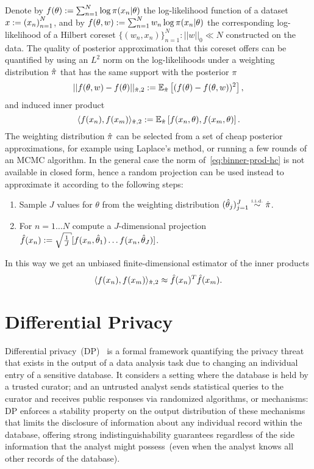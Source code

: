 Denote by $ f(\theta) := \sum_{n=1}^{N} \log\pi(x_n|\theta) $ the log-likelihood function of a dataset $x := {(x_n)}_{n=1}^{N}$, and by $ f(\theta,w) := \sum_{n=1}^{N} w_n\log\pi(x_n|\theta) $ the corresponding log-likelihood of a Hilbert coreset $\{(w_n, x_n)\}_{n=1}^{N} : ||w||_0 \ll N$ constructed on the data. The quality of posterior approximation that this coreset offers can be quantified by using an $L^2$ norm on the log-likelihoods under a weighting distribution $\hat{\pi}$ that has the same support with the posterior $\pi$ 
\[
||f(\theta, w) - f(\theta)||_{\hat{\pi},2} := \mathbb{E}_{\hat{\pi}} \left[ (f(\theta) - f(\theta, w))^2\right],
\]
and induced inner product
\[
\label{eq:binner-prod-hc}
\langle f(x_n), f(x_m) \rangle_{\hat{\pi}, 2} := \mathbb{E}_{\hat{\pi}}\left[f(x_n, \theta), f(x_m, \theta)\right].
\]
The weighting distribution $\hat{\pi}$ can be selected from a set of cheap posterior approximations, for example using Laplace's method, or running a few rounds of an MCMC algorithm. In the general case the norm of~\cref{eq:binner-prod-hc} is not available in closed form, hence a random projection can be used instead to approximate it according to the following steps:
\begin{enumerate}
	\item Sample $J$ values for $\theta$ from the weighting distribution $(\htheta_j)_{j=1}^{J} \distiid \hpi$.
	\item For $n=1 \ldots N$ compute a $J$-dimensional projection $ \hf(x_n) \defined \sqrt{\frac{1}{J}}[f(x_n, \htheta_1) \ldots f(x_n, \htheta_J)]$.
\end{enumerate}
In this way we get an unbiased finite-dimensional estimator of the inner products
\[
\langle f(x_n), f(x_m) \rangle_{\hat{\pi}, 2}  \approx \hat{f}(x_n)^T \hat{f}(x_m).
\]


\section{Differential Privacy}

Differential privacy~(DP)~\citep{dwork2006calibrating,dwork14} is a formal framework quantifying the privacy threat that exists in the output of a data analysis task due to changing an individual entry of a sensitive database. It considers a setting where the database is held by a trusted curator; and an untrusted analyst sends statistical queries to the curator and receives public responses via randomized algorithms, or mechanisms: DP enforces a stability property on the output distribution of these mechanisms that limits the disclosure of information about any individual record within the database, offering strong indistinguishability guarantees regardless of the side information that the analyst might possess~(even when the analyst knows all other records of the database). 

